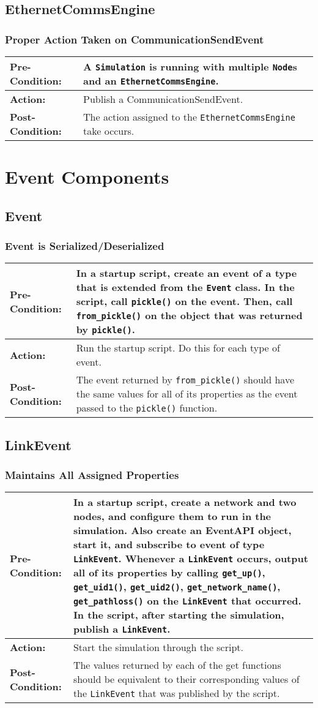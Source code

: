\documentclass[titlepage]{article}
\newcommand{\testcase}[3]{
    \begin{center}
    \begin{tabular}{| l | p{0.7\textwidth}|}
        \hline
        \rowcolor[gray]{0.8}\textbf{Pre-Condition:} & #1 \\ \hline
        \textbf{Action:} & #2 \\ \hline
        \rowcolor[gray]{0.8}\textbf{Post-Condition:} & #3 \\ \hline
    \end{tabular}
    \end{center}
}
\begin{document}
\subsection{EthernetCommsEngine}
\subsubsection{Proper Action Taken on CommunicationSendEvent}
\testcase{A \texttt{Simulation} is running with multiple \texttt{Node}s and an \texttt{EthernetCommsEngine}.}{Publish a
CommunicationSendEvent. }{The action assigned to the \texttt{EthernetCommsEngine} take occurs.}

\section{Event Components}
\subsection{Event}
\subsubsection{Event is Serialized/Deserialized}
\testcase{In a startup script, create an event of a type that is extended from the \texttt{Event} class. In the script, call \texttt{pickle()} on the event. Then, call \texttt{from\_pickle()} on the object that was returned by \texttt{pickle()}.}{Run the startup script. Do this for each type of event.}{The event returned by \texttt{from\_pickle()} should have the same values for all of its properties as the event passed to the \texttt{pickle()} function.}

\subsection{LinkEvent}
\subsubsection{Maintains All Assigned Properties}
\testcase{In a startup script, create a network and two nodes, and configure them to run in the simulation. Also create an EventAPI object, start it, and subscribe to event of type \texttt{LinkEvent}. Whenever a \texttt{LinkEvent} occurs, output all of its properties by calling \texttt{get\_up()}, \texttt{get\_uid1()}, \texttt{get\_uid2()}, \texttt{get\_network\_name()}, \texttt{get\_pathloss()} on the \texttt{LinkEvent} that occurred. In the script, after starting the simulation, publish a \texttt{LinkEvent}.}{Start the simulation through the script.}{The values returned by each of the get functions should be equivalent to their corresponding values of the \texttt{LinkEvent} that was published by the script.}
\end{document}
